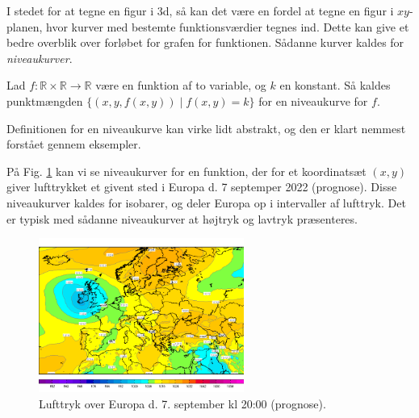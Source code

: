 I stedet for at tegne en figur i 3d, så kan det være en fordel at tegne en figur i $xy$-planen, hvor kurver med bestemte funktionsværdier tegnes ind. Dette kan give et bedre overblik over forløbet for grafen for funktionen. Sådanne kurver kaldes for \textit{niveaukurver}.
\begin{defn}[Niveaukurver]
	Lad $f: \mathbb{R} \times \mathbb{R} \to \mathbb{R}$ være en funktion af to variable, og 
	$k$ en konstant. Så kaldes punktmængden $\{(x,y,f(x,y)) \mid f(x,y) = k\}$ for en 
	niveaukurve for $f$. 
\end{defn}
Definitionen for en niveaukurve kan virke lidt abstrakt, og den er klart nemmest forstået gennem eksempler. 
\begin{exa}
	På Fig. \ref{fig:isobar} kan vi se niveaukurver for en funktion, der for et koordinatsæt $(x,y)$ giver lufttrykket et givent sted i Europa d. 7 septemper 2022 (prognose). 
	Disse niveaukurver kaldes for isobarer, og deler Europa op i intervaller af lufttryk. Det er typisk med sådanne niveaukurver at højtryk og lavtryk præsenteres.
	\begin{figure}[H]
		\centering
		\includegraphics[width=0.6\textwidth]{Billeder/Lufttryk.png}
		\caption{Lufttryk over Europa d. 7. september kl 20:00 (prognose).}
		\label{fig:isobar}
	\end{figure}
\end{exa}


